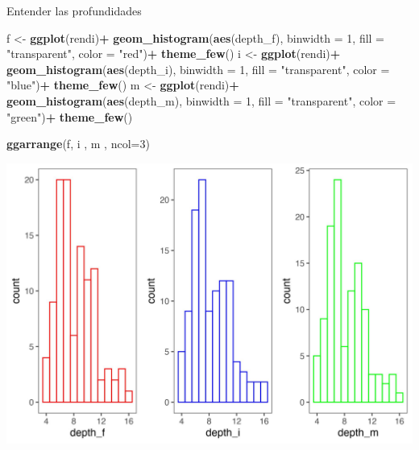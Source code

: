 \documentclass[
]{article}
\newenvironment{Shaded}{\begin{snugshade}}{\end{snugshade}}
\newcommand{\AttributeTok}[1]{\textcolor[rgb]{0.13,0.29,0.53}{#1}}
\newcommand{\DecValTok}[1]{\textcolor[rgb]{0.00,0.00,0.81}{#1}}
\newcommand{\FunctionTok}[1]{\textcolor[rgb]{0.13,0.29,0.53}{\textbf{#1}}}
\newcommand{\NormalTok}[1]{#1}
\newcommand{\OtherTok}[1]{\textcolor[rgb]{0.56,0.35,0.01}{#1}}
\newcommand{\SpecialCharTok}[1]{\textcolor[rgb]{0.81,0.36,0.00}{\textbf{#1}}}
\newcommand{\StringTok}[1]{\textcolor[rgb]{0.31,0.60,0.02}{#1}}
\begin{document}
Entender las profundidades

\begin{Shaded}
\begin{Highlighting}[]
\NormalTok{f }\OtherTok{\textless{}{-}} \FunctionTok{ggplot}\NormalTok{(rendi)}\SpecialCharTok{+}
  \FunctionTok{geom\_histogram}\NormalTok{(}\FunctionTok{aes}\NormalTok{(depth\_f),}
                 \AttributeTok{binwidth =} \DecValTok{1}\NormalTok{,}
                 \AttributeTok{fill =} \StringTok{"transparent"}\NormalTok{, }\AttributeTok{color =} \StringTok{"red"}\NormalTok{)}\SpecialCharTok{+}
  \FunctionTok{theme\_few}\NormalTok{()}
\NormalTok{i }\OtherTok{\textless{}{-}} \FunctionTok{ggplot}\NormalTok{(rendi)}\SpecialCharTok{+}
  \FunctionTok{geom\_histogram}\NormalTok{(}\FunctionTok{aes}\NormalTok{(depth\_i),}
                 \AttributeTok{binwidth =} \DecValTok{1}\NormalTok{,}
                 \AttributeTok{fill =} \StringTok{"transparent"}\NormalTok{, }\AttributeTok{color =} \StringTok{"blue"}\NormalTok{)}\SpecialCharTok{+}
  \FunctionTok{theme\_few}\NormalTok{()}
\NormalTok{m }\OtherTok{\textless{}{-}} \FunctionTok{ggplot}\NormalTok{(rendi)}\SpecialCharTok{+}
  \FunctionTok{geom\_histogram}\NormalTok{(}\FunctionTok{aes}\NormalTok{(depth\_m),}
                 \AttributeTok{binwidth =} \DecValTok{1}\NormalTok{,}
                 \AttributeTok{fill =} \StringTok{"transparent"}\NormalTok{, }\AttributeTok{color =} \StringTok{"green"}\NormalTok{)}\SpecialCharTok{+}
  \FunctionTok{theme\_few}\NormalTok{()}

\FunctionTok{ggarrange}\NormalTok{(f, i , m , }\AttributeTok{ncol=}\DecValTok{3}\NormalTok{)}
\end{Highlighting}
\end{Shaded}

\begin{center}\includegraphics{SAR_Method_files/figure-latex/unnamed-chunk-7-1} \end{center}
\end{document}
